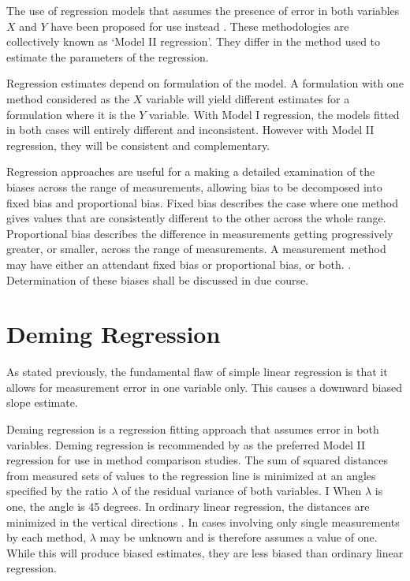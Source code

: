 \documentclass[12pt, a4paper]{report}
\theoremstyle{plain}
\theoremstyle{definition}
\theoremstyle{remark}
\begin{document}
	The use of regression models that assumes the presence of error in both variables $X$ and $Y$ have been proposed for use instead
	\citep{CornCoch,ludbrook97}. These methodologies are collectively known as `Model II regression'. They differ in the method used to
	estimate the parameters of the regression.
	
	Regression estimates depend on formulation of the model. A formulation with one method considered as the $X$ variable will yield different estimates for a formulation where it is the $Y$
	variable. With Model I regression, the models fitted in both cases will entirely different and inconsistent. However with Model II
	regression, they will be consistent and complementary.
	
	Regression approaches are useful for a making a detailed examination of the biases across the range of measurements, allowing bias to be decomposed into fixed bias and proportional bias.
	Fixed bias describes the case where one method gives values that are consistently different to the other across the whole range. Proportional
	bias describes the difference in measurements getting progressively greater, or smaller, across the range of measurements. A measurement method may have either an attendant fixed bias or proportional bias, or both. \citep{ludbrook97}. Determination of these biases shall be discussed in due course.
	
	
	
	\section{Deming Regression}
	
	As stated previously, the fundamental flaw of simple linear regression is that it allows for measurement error in one variable only. This causes a downward biased slope estimate.
	
	Deming regression is a regression fitting approach that assumes error in both variables. Deming regression is recommended by \citet*{CornCoch} as the
	preferred Model II regression for use in method comparison studies.
	The sum of squared distances from measured sets of values to the regression line is minimized at an angles specified by the ratio $\lambda$ of the residual variance of both variables. I
	When $\lambda$ is one, the angle is 45 degrees. In ordinary linear regression, the distances are minimized in the vertical directions \citep{linnet99}.
	In cases involving only single measurements by each method, $\lambda$ may be unknown and is therefore assumes a value of one. While this will produce biased estimates, they are less biased than ordinary linear regression.
	
\end{document}
